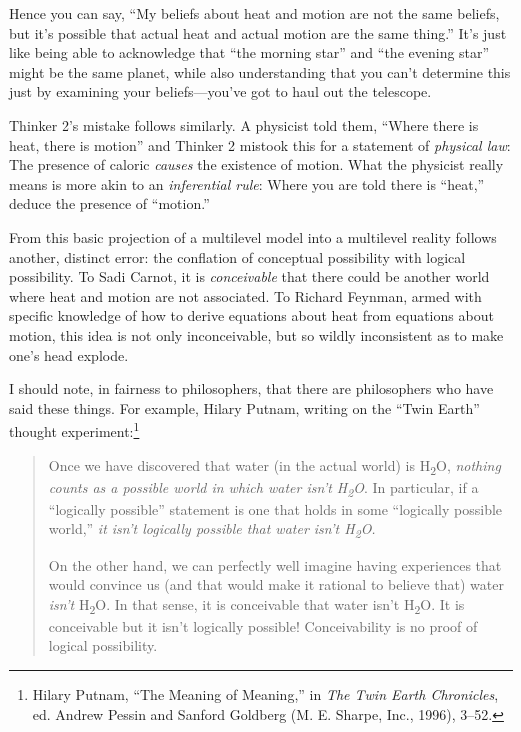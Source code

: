 {
 Hence you can say, ``My beliefs about heat and
motion are not the same beliefs, but it's possible that
actual heat and actual motion are the same thing.''
It's just like being able to acknowledge that
``the morning star'' and
``the evening star'' might be the
same planet, while also understanding that you can't
determine this just by examining your beliefs---you've
got to haul out the telescope.}

{
 Thinker 2's mistake follows similarly. A physicist
told them, ``Where there is heat, there is
motion'' and Thinker 2 mistook this for a statement
of \textit{physical law}: The presence of caloric \textit{causes} the
existence of motion. What the physicist really means is more akin to an
\textit{inferential rule}: Where you are told there is
``heat,'' deduce the presence of
``motion.''}

{
 From this basic projection of a multilevel model into a multilevel
reality follows another, distinct error: the conflation of conceptual
possibility with logical possibility. To Sadi Carnot, it is
\textit{conceivable} that there could be another world where heat and
motion are not associated. To Richard Feynman, armed with specific
knowledge of how to derive equations about heat from equations about
motion, this idea is not only inconceivable, but so wildly inconsistent
as to make one's head explode.}

{
 I should note, in fairness to philosophers, that there are
philosophers who have said these things. For example, Hilary Putnam,
writing on the ``Twin Earth''
thought experiment:\footnote{Hilary Putnam, ``The Meaning of
Meaning,'' in \textit{The Twin Earth Chronicles}, ed.
Andrew Pessin and Sanford Goldberg (M. E. Sharpe, Inc., 1996), 3--52.}}

\begin{quotation}
{
 Once we have discovered that water (in the actual world) is
H\textsubscript{2}O, \textit{nothing counts as a possible world in
which water isn't
H\textsubscript{2}O}. In particular, if a
``logically possible'' statement is
one that holds in some ``logically possible
world,'' \textit{it isn't logically
possible that water isn't
H\textsubscript{2}O.}}

{
 On the other hand, we can perfectly well imagine having
experiences that would convince us (and that would make it rational to
believe that) water \textit{isn't} H\textsubscript{2}O.
In that sense, it is conceivable that water isn't
H\textsubscript{2}O. It is conceivable but it isn't
logically possible! Conceivability is no proof of logical possibility.}
\end{quotation}

